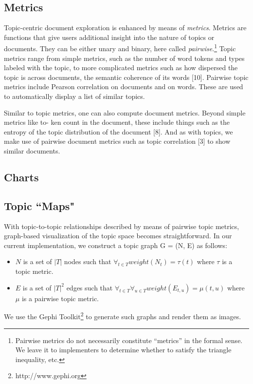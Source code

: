 \documentclass[11pt]{article}
\begin{document}
\subsection{Metrics}
Topic-centric document exploration is enhanced by means of \textit{metrics}.
Metrics are functions that give users additional insight into the nature of
topics or documents. They can be either unary and binary,
here called \textit{pairwise}.\footnote{Pairwise metrics do not necessarily
constitute ``metrics'' in the formal sense. We leave it to implementers to
determine whether to satisfy the triangle inequality, etc.} Topic metrics range
from simple metrics, such as the number of word tokens and types labeled with
the topic, to more complicated metrics such as how dispersed the topic is across
documents, the semantic coherence of its words [10]. Pairwise topic metrics
include Pearson correlation on documents and on words. These are used to automatically
display a list of similar topics.

Similar to topic metrics, one can also compute document metrics. Beyond simple metrics like to-
ken count in the document, these include things such as the entropy of the topic distribution of
the document [8]. And as with topics, we make use of pairwise document metrics such as topic
correlation [3] to show similar documents.

\subsection{Charts}



\subsection{Topic ``Maps"}
With topic-to-topic relationships described by means of pairwise topic metrics,
graph-based visualization of the topic space becomes straightforward. In our
current implementation, we construct a topic graph G = (N, E) as follows:
\begin{itemize}
\item $N$ is a set of $|T|$ nodes such that $\forall_{t\in T} weight(N_{t}) =
\tau(t)$ where $\tau$ is a topic metric.
\item $E$ is a set of $|T|^2$ edges such that $\forall_{t\in T}\forall_{u\in T}
weight(E_{t,u}) = \mu(t,u)$ where $\mu$ is a pairwise topic metric.
\end{itemize}

We use the Gephi Toolkit\footnote{http://www.gephi.org} to generate such graphs
and render them as images.
\end{document}
